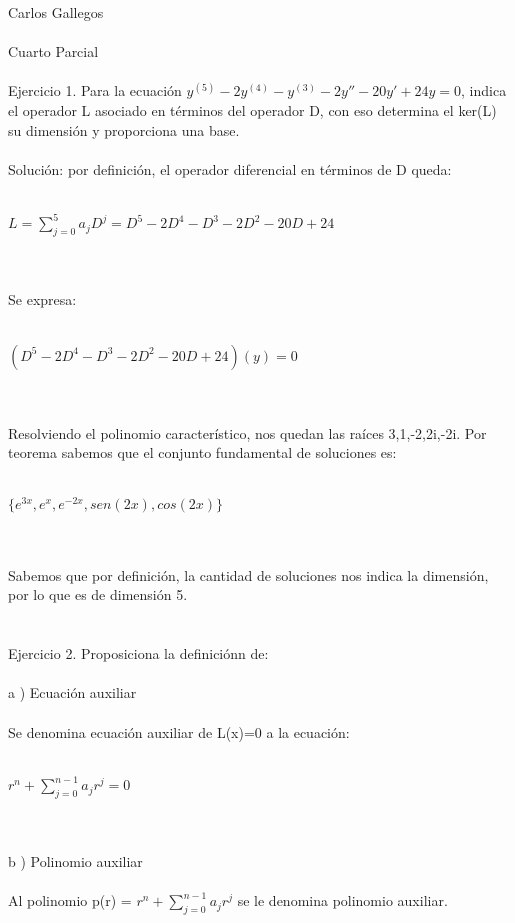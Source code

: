 \documentclass[a4paper,10pt]{article}
\title{}
\author{}
\date{}
\begin{document}
\maketitle
Carlos Gallegos\\\\
Cuarto Parcial\\\\
Ejercicio 1. Para la ecuación $y^{(5)}-2y^{(4)}-y^{(3)}-2y''-20y'+24y = 0$, indica el operador L asociado en términos del operador D, con eso determina el ker(L) su dimensión y proporciona una base.\\\\
Solución: por definición, el operador diferencial en términos de D queda:\\\\
\centerline{$L= \sum_{j=0}^{5} a_j D^j = D^5 - 2D^4 - D^3 - 2D^2 -20D + 24 $}\\\\
Se expresa:\\\\
\centerline{$(D^5 - 2D^4 - D^3 - 2D^2 -20D + 24)(y)=0$}\\\\
Resolviendo el polinomio característico, nos quedan las raíces 3,1,-2,2i,-2i. Por teorema sabemos que el conjunto fundamental de soluciones es:\\\\
\centerline{$\{e^{3x}, e^x, e^{-2x}, sen(2x), cos(2x)\}$}\\\\
Sabemos que por definición, la cantidad de soluciones nos indica la dimensión, por lo que es de dimensión 5.
\\\\\\
Ejercicio 2. Proposiciona la definiciónn de:\\\\
a ) Ecuación auxiliar\\\\
Se denomina ecuación auxiliar de L(x)=0 a la ecuación:\\\\
\centerline{$r^n + \sum_{j=0}^{n-1} a_j r^j =0$}\\\\
b ) Polinomio auxiliar\\\\
Al polinomio p(r) = $r^n + \sum_{j=0}^{n-1} a_j r^j$ se le denomina polinomio auxiliar.\\\\
\end{document}
